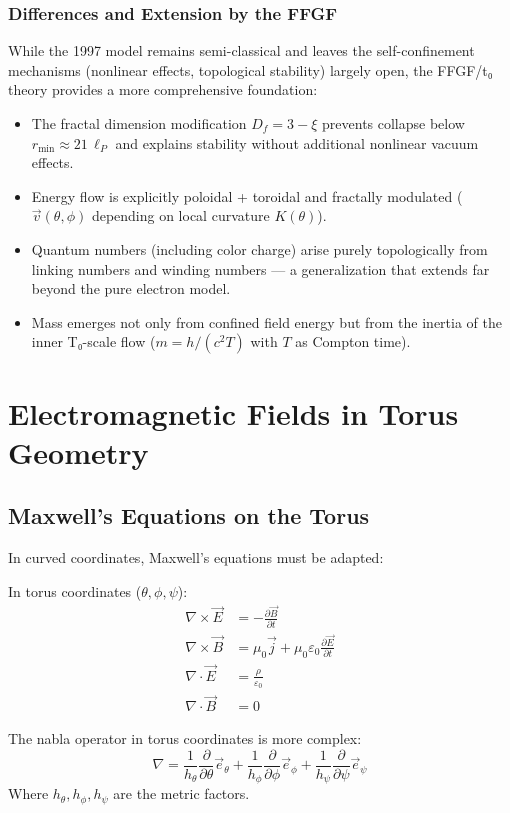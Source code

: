 \subsubsection{Differences and Extension by the FFGF}

While the 1997 model remains semi-classical and leaves the self-confinement mechanisms (nonlinear effects, topological stability) largely open, the FFGF/t₀ theory provides a more comprehensive foundation:

\begin{itemize}
	\item The fractal dimension modification $D_f = 3 - \xi$ prevents collapse below $r_{\min} \approx 21\,\ell_P$ and explains stability without additional nonlinear vacuum effects.
	\item Energy flow is explicitly poloidal + toroidal and fractally modulated ($\vec{v}(\theta,\phi)$ depending on local curvature $K(\theta)$).
	\item Quantum numbers (including color charge) arise purely topologically from linking numbers and winding numbers — a generalization that extends far beyond the pure electron model.
	\item Mass emerges not only from confined field energy but from the inertia of the inner T₀-scale flow ($m = h/(c^2 T)$ with $T$ as Compton time).
\end{itemize}

\section{Electromagnetic Fields in Torus Geometry}
\subsection{Maxwell's Equations on the Torus}
In curved coordinates, Maxwell's equations must be adapted:

In torus coordinates (\( \theta, \phi, \psi \)):
\begin{align}
	\nabla \times \vec{E} &= -\frac{\partial \vec{B}}{\partial t} \\
	\nabla \times \vec{B} &= \mu_0 \vec{j} + \mu_0 \varepsilon_0 \frac{\partial \vec{E}}{\partial t} \\
	\nabla \cdot \vec{E} &= \frac{\rho}{\varepsilon_0} \\
	\nabla \cdot \vec{B} &= 0
\end{align}

The nabla operator in torus coordinates is more complex:
\[
\nabla = \frac{1}{h_\theta} \frac{\partial}{\partial \theta} \vec{e}_\theta + \frac{1}{h_\phi} \frac{\partial}{\partial \phi} \vec{e}_\phi + \frac{1}{h_\psi} \frac{\partial}{\partial \psi} \vec{e}_\psi
\]
Where \( h_\theta, h_\phi, h_\psi \) are the metric factors.

